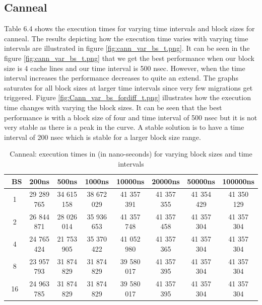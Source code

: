 \documentclass{listhesis}
\begin{document}
\subsection{Canneal}
Table 6.4 shows the execution times for varying time intervals and block sizes for canneal. The results depicting how the execution time varies with varying time intervals are illustrated in figure \ref{fig:cann_var_bs_t.png}. It can be seen in the figure \ref{fig:cann_var_bs_t.png} that we get the best performance when our block size is 4 cache lines and our time interval is 500 nsec. However, when the time interval increases the performance decreases to quite an extend. The graphs saturates for all block sizes at larger time intervals since very few migrations get triggered. Figure \ref{fig:Cann_var_bs_fordiff_t.png} illustrates how the execution time changes with varying the block sizes. It can be seen that the best performance is with a block size of four and time interval of 500 nsec but it is not very stable as there is a peak in the curve. A stable solution is to have a time interval of 200 nsec which is stable for a larger block size range. 

\begin{table}[h!]
\begin{center}
 \begin{tabular}{|| c | c | c | c| c | c | c | c||} 
 \hline
 \ \textbf{BS} & \textbf{200ns} & \textbf{500ns}  & \textbf{1000ns} & \textbf{10000ns} & \textbf{20000ns} & \textbf{50000ns} & \textbf{100000ns}\\ [0.5 ex] 
 \hline\hline
   1 & 29 289 765 & 34 615 158 &  38 672 029 & 41 357 391 & 41 357 355 & 41 354 429 &  41 350 129 \\ 
 \hline
   2 & 26 844 871 & 28 026 014 & 35 936 653 & 41 357 748 & 41 357 458 & 41 357 304 & 41 357 304 \\
 \hline
   4 & 24 765 424 & 21 753 905 & 35 370 422 & 41 052 980 & 41 357 365 & 41 357 304 & 41 357 304 \\
 \hline
   8 & 23 957 793 & 31 874 829 & 31 874 829 & 39 580 017 & 41 357 395 & 41 357 304 & 41 357 304 \\
  \hline
   16 & 24 963 785 & 31 874 829 & 31 874 829 & 39 580 017 & 41 357 395 & 41 357 304 & 41 357 304 \\
    \hline
\end{tabular}
 \caption{Canneal: execution times in (in nano-seconds) for varying block sizes and time intervals}
 \label{table:ExecTimes2}
\end{center}
\end{table}
\end{document}
